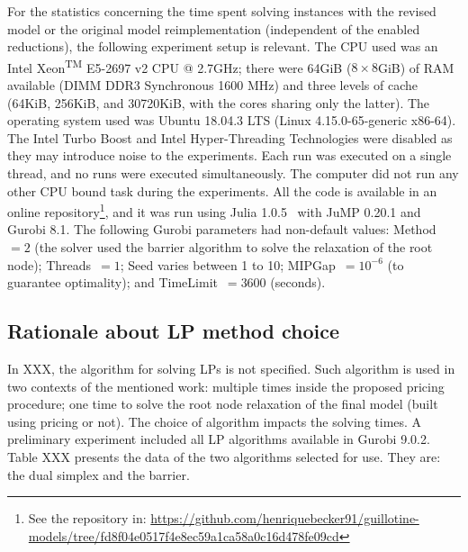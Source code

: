 \documentclass[smallextended]{svjour3}       %
\begin{document}
For the statistics concerning the time spent solving instances with the revised model or the original model reimplementation (independent of the enabled reductions), the following experiment setup is relevant.
The CPU used was an Intel\textsuperscript{\textregistered} Xeon\textsuperscript{TM} E5-2697 v2 CPU @ 2.7GHz;
there were 64GiB (\(8 \times 8\)GiB) of RAM available (DIMM DDR3 Synchronous 1600 MHz) and three levels of cache (64KiB, 256KiB, and 30720KiB, with the cores sharing only the latter).
The operating system used was Ubuntu 18.04.3 LTS (Linux 4.15.0-65-generic x86-64).
The Intel\textsuperscript{\textregistered} Turbo Boost and Intel\textsuperscript{\textregistered} Hyper-Threading Technologies were disabled as they may introduce noise to the experiments.
Each run was executed on a single thread, and no runs were executed simultaneously.
The computer did not run any other CPU bound task during the experiments.
All the code is available in an online repository\footnote{See the repository in: \url{https://github.com/henriquebecker91/guillotine-models/tree/fd8f04e0517f4e8ec59a1ca58a0c16d478fe09cd}}, and it was run using Julia 1.0.5~\cite{julia} with JuMP 0.20.1 and Gurobi 8.1.%
The following Gurobi parameters had non-default values: Method~\(= 2\) (the solver used the barrier algorithm to solve the relaxation of the root node); Threads~\(= 1\); Seed varies between 1 to 10; MIPGap~\(= 10^{-6}\) (to guarantee optimality); and TimeLimit~\(= 3600\) (seconds).

\subsection{Rationale about LP method choice}

In XXX, the algorithm for solving LPs is not specified.
Such algorithm is used in two contexts of the mentioned work:
multiple times inside the proposed pricing procedure;
one time to solve the root node relaxation of the final model
(built using pricing or not).
The choice of algorithm impacts the solving times.
A preliminary experiment included all LP algorithms available in Gurobi 9.0.2.
Table XXX presents the data of the two algorithms selected for use.
They are: the dual simplex and the barrier.
\end{document}

